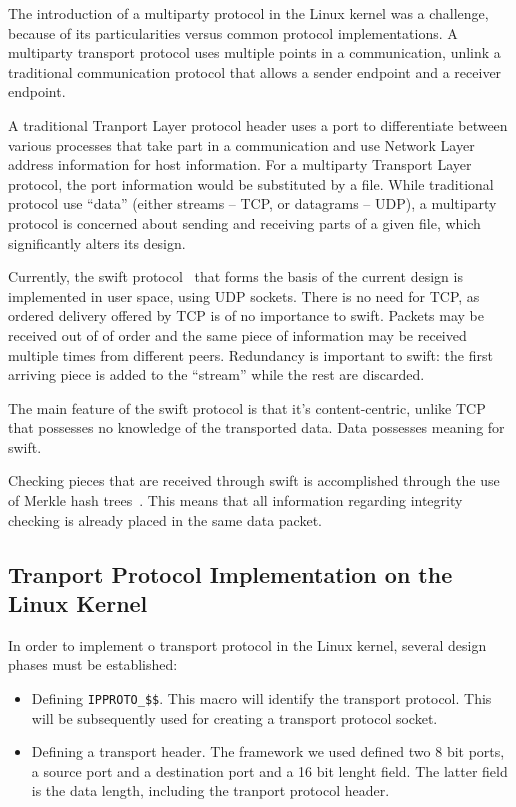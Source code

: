 The introduction of a multiparty protocol in the Linux kernel was a challenge,
because of its particularities versus common protocol implementations. A
multiparty transport protocol uses multiple points in a communication, unlink
a traditional communication protocol that allows a sender endpoint and a
receiver endpoint.

A traditional Tranport Layer protocol header uses a port to differentiate
between various processes that take part in a communication and use Network
Layer address information for host information. For a multiparty Transport
Layer protocol, the port information would be substituted by a file. While
traditional protocol use ``data'' (either streams -- TCP, or datagrams --
UDP), a multiparty protocol is concerned about sending and receiving parts of
a given file, which significantly alters its design.

Currently, the swift protocol~\cite{TODO} that forms the basis of the
current design is implemented in user space, using UDP sockets. There is no
need for TCP, as ordered delivery offered by TCP is of no importance to swift.
Packets may be received out of of order and the same piece of information may
be received multiple times from different peers. Redundancy is important to
swift: the first arriving piece is added to the ``stream'' while the rest are
discarded.

The main feature of the swift protocol is that it's content-centric, unlike
TCP that possesses no knowledge of the transported data. Data possesses
meaning for swift.

Checking pieces that are received through swift is accomplished through the
use of Merkle hash trees~\cite{TODO}. This means that all information
regarding integrity checking is already placed in the same data packet.


\subsection{Tranport Protocol Implementation on the Linux Kernel}

In order to implement o transport protocol in the Linux kernel, several design
phases must be established:

\begin{itemize}
  \item Defining \texttt{IPPROTO\_\$\$}. This macro will identify the
  transport protocol. This will be subsequently used for creating a transport
  protocol socket.
  \item Defining a transport header. The framework we used defined two 8 bit
  ports, a source port and a destination port and a 16 bit lenght field. The
  latter field is the data length, including the tranport protocol header.
\end{itemize}

